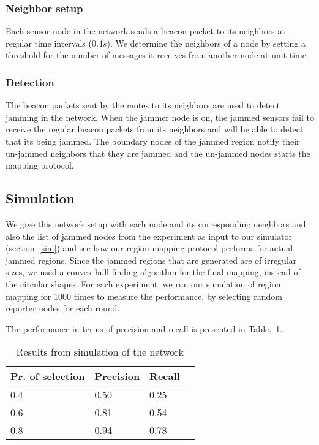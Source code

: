 \documentclass[conference]{IEEEtran}
\begin{document}
\subsubsection{Neighbor setup}
Each sensor node in the network sends a beacon packet to its neighbors at regular time intervals ($0.4s$). We determine the neighbors of a node by setting a threshold for the number of messages it receives from another node at unit time.

\subsubsection{Detection}
The beacon packets sent by the motes to its neighbors are used to detect jamming in the network. When the jammer node is on, the jammed sensors fail to receive the regular beacon packets from its neighbors and will be able to detect that its being jammed. The boundary nodes of the jammed region notify their un-jammed neighbors that they are jammed and the un-jammed nodes starts the mapping protocol. 

\subsection{Simulation}
We give this network setup with each node and its corresponding neighbors and also the list of jammed nodes from the experiment as input to our simulator (section~\ref{sim}) and see how our region mapping protocol performs for actual jammed regions. Since the jammed regions that are generated are of irregular sizes, we used a convex-hull finding algorithm for the final mapping, instead of the circular shapes. For each experiment, we run our simulation of region mapping for 1000 times to measure the performance, by selecting random reporter nodes for each round.

The performance in terms of precision and recall is presented in Table.~\ref{exp_result}.

\begin{table}
\begin{center}
\caption{Results from simulation of the network}
\begin{tabular}{ | l | p{1.5cm}| p{1.5cm} | p{1.5cm}|}
\hline
Pr. of selection & Precision & Recall\\ \hline\hline
0.4 & 0.50 & 0.25\\ \hline
0.6 & 0.81 & 0.54\\ \hline
0.8 & 0.94 & 0.78\\ \hline
\end{tabular}
\label{exp_result}
\end{center}
\end{table}
\end{document}
